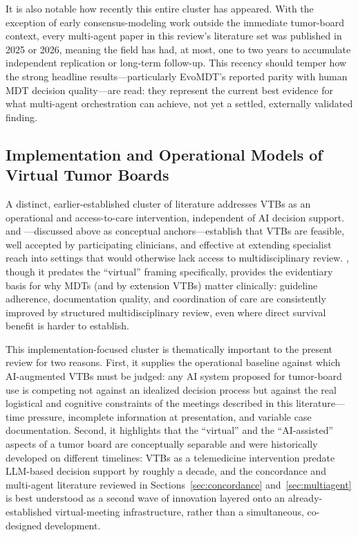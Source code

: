 \documentclass{article}
\begin{document}
It is also notable how recently this entire cluster has appeared. With the exception of early consensus-modeling work outside the immediate tumor-board context, every multi-agent paper in this review's literature set was published in 2025 or 2026, meaning the field has had, at most, one to two years to accumulate independent replication or long-term follow-up. This recency should temper how the strong headline results---particularly EvoMDT's reported parity with human MDT decision quality---are read: they represent the current best evidence for what multi-agent orchestration can achieve, not yet a settled, externally validated finding.

\subsection{Implementation and Operational Models of Virtual Tumor Boards}

A distinct, earlier-established cluster of literature addresses VTBs as an operational and access-to-care intervention, independent of AI decision support. \citet{marshall2014} and \citet{thiagarajan2023}---discussed above as conceptual anchors---establish that VTBs are feasible, well accepted by participating clinicians, and effective at extending specialist reach into settings that would otherwise lack access to multidisciplinary review. \citet{patkar2011}, though it predates the ``virtual'' framing specifically, provides the evidentiary basis for why MDTs (and by extension VTBs) matter clinically: guideline adherence, documentation quality, and coordination of care are consistently improved by structured multidisciplinary review, even where direct survival benefit is harder to establish.

This implementation-focused cluster is thematically important to the present review for two reasons. First, it supplies the operational baseline against which AI-augmented VTBs must be judged: any AI system proposed for tumor-board use is competing not against an idealized decision process but against the real logistical and cognitive constraints of the meetings described in this literature---time pressure, incomplete information at presentation, and variable case documentation. Second, it highlights that the ``virtual'' and the ``AI-assisted'' aspects of a tumor board are conceptually separable and were historically developed on different timelines: VTBs as a telemedicine intervention predate LLM-based decision support by roughly a decade, and the concordance and multi-agent literature reviewed in Sections~\ref{sec:concordance} and~\ref{sec:multiagent} is best understood as a second wave of innovation layered onto an already-established virtual-meeting infrastructure, rather than a simultaneous, co-designed development.
\end{document}

